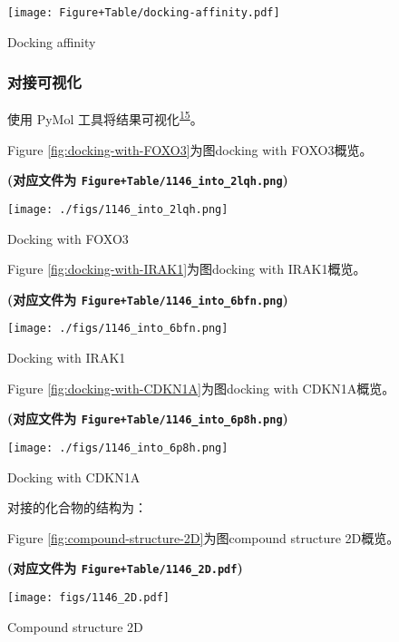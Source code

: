 \documentclass[
]{article}
\begin{document}
\def\@captype{figure}
\begin{center}
\texttt{[image: Figure+Table/docking-affinity.pdf]}
\caption{Docking affinity}\label{fig:docking-affinity}
\end{center}

\hypertarget{ux5bf9ux63a5ux53efux89c6ux5316}{%
\subsubsection{对接可视化}\label{ux5bf9ux63a5ux53efux89c6ux5316}}

使用 PyMol 工具将结果可视化\textsuperscript{\protect\hyperlink{ref-LigandDockingSeelig2010}{15}}。

Figure \ref{fig:docking-with-FOXO3}为图docking with FOXO3概览。

\textbf{(对应文件为 \texttt{Figure+Table/1146\_into\_2lqh.png})}

\def\@captype{figure}
\begin{center}
\texttt{[image: ./figs/1146\_into\_2lqh.png]}
\caption{Docking with FOXO3}\label{fig:docking-with-FOXO3}
\end{center}

Figure \ref{fig:docking-with-IRAK1}为图docking with IRAK1概览。

\textbf{(对应文件为 \texttt{Figure+Table/1146\_into\_6bfn.png})}

\def\@captype{figure}
\begin{center}
\texttt{[image: ./figs/1146\_into\_6bfn.png]}
\caption{Docking with IRAK1}\label{fig:docking-with-IRAK1}
\end{center}

Figure \ref{fig:docking-with-CDKN1A}为图docking with CDKN1A概览。

\textbf{(对应文件为 \texttt{Figure+Table/1146\_into\_6p8h.png})}

\def\@captype{figure}
\begin{center}
\texttt{[image: ./figs/1146\_into\_6p8h.png]}
\caption{Docking with CDKN1A}\label{fig:docking-with-CDKN1A}
\end{center}

对接的化合物的结构为：

Figure \ref{fig:compound-structure-2D}为图compound structure 2D概览。

\textbf{(对应文件为 \texttt{Figure+Table/1146\_2D.pdf})}

\def\@captype{figure}
\begin{center}
\texttt{[image: figs/1146\_2D.pdf]}
\caption{Compound structure 2D}\label{fig:compound-structure-2D}
\end{center}
\end{document}
